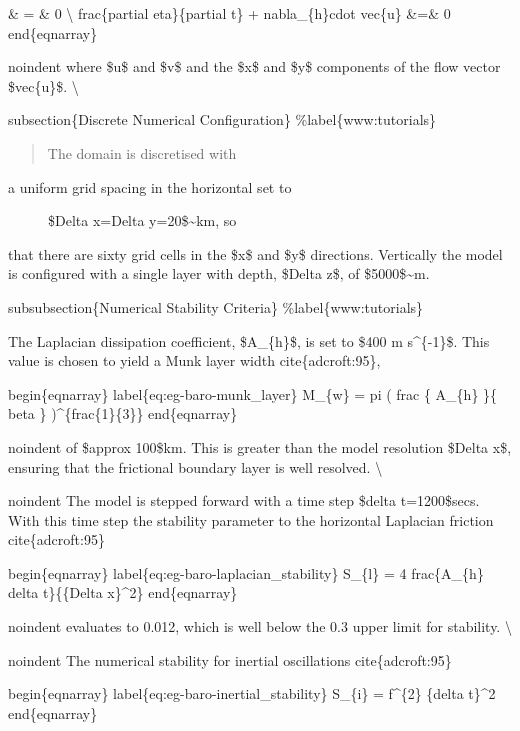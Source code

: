 \documentclass[letterpaper,10pt,english]{sphinxmanual}
\begin{document}
\& = \&
0
\textbackslash{}
frac\{partial eta\}\{partial t\} + nabla\_\{h\}cdot vec\{u\}
\&=\&
0
end\{eqnarray\}

noindent where \$u\$ and \$v\$ and the \$x\$ and \$y\$ components of the
flow vector \$vec\{u\}\$.
\textbackslash{}

subsection\{Discrete Numerical Configuration\}
\%label\{www:tutorials\}
\begin{quote}

The domain is discretised with
\end{quote}
\begin{description}
\item[{a uniform grid spacing in the horizontal set to}] \leavevmode
\$Delta x=Delta y=20\$\textasciitilde{}km, so

\end{description}

that there are sixty grid cells in the \$x\$ and \$y\$ directions. Vertically the
model is configured with a single layer with depth, \$Delta z\$, of \$5000\$\textasciitilde{}m.

subsubsection\{Numerical Stability Criteria\}
\%label\{www:tutorials\}

The Laplacian dissipation coefficient, \$A\_\{h\}\$, is set to \$400 m s\textasciicircum{}\{-1\}\$.
This value is chosen to yield a Munk layer width cite\{adcroft:95\},

begin\{eqnarray\}
label\{eq:eg-baro-munk\_layer\}
M\_\{w\} = pi ( frac \{ A\_\{h\} \}\{ beta \} )\textasciicircum{}\{frac\{1\}\{3\}\}
end\{eqnarray\}

noindent  of \$approx 100\$km. This is greater than the model
resolution \$Delta x\$, ensuring that the frictional boundary
layer is well resolved.
\textbackslash{}

noindent The model is stepped forward with a
time step \$delta t=1200\$secs. With this time step the stability
parameter to the horizontal Laplacian friction cite\{adcroft:95\}

begin\{eqnarray\}
label\{eq:eg-baro-laplacian\_stability\}
S\_\{l\} = 4 frac\{A\_\{h\} delta t\}\{\{Delta x\}\textasciicircum{}2\}
end\{eqnarray\}

noindent evaluates to 0.012, which is well below the 0.3 upper limit
for stability.
\textbackslash{}

noindent The numerical stability for inertial oscillations
cite\{adcroft:95\}

begin\{eqnarray\}
label\{eq:eg-baro-inertial\_stability\}
S\_\{i\} = f\textasciicircum{}\{2\} \{delta t\}\textasciicircum{}2
end\{eqnarray\}
\end{document}
